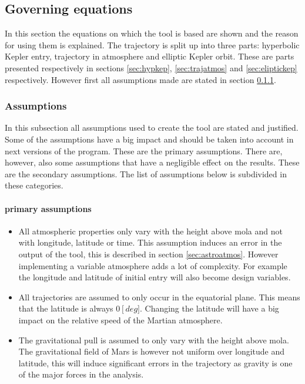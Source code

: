 \subsection{Governing equations}
\label{sec:astrogov}
In this section the equations on which the tool is based are shown and the reason for using them is explained. The trajectory is split up into three parts: hyperbolic Kepler entry, trajectory in atmosphere and elliptic Kepler orbit. These are parts presented respectively in sections \ref{sec:hypkep}, \ref{sec:trajatmos} and \ref{sec:eliptickep} respectively. However first all assumptions made are stated in section \ref{sec:astroassumption}.

\subsubsection{Assumptions}
 \label{sec:astroassumption}
 In this subsection all assumptions used to create the tool are stated and justified. Some of the assumptions have a big impact and should be taken into account in next versions of the program. These are the primary assumptions. There are, however, also some assumptions that have a negligible effect on the results. These are the secondary assumptions. The list of assumptions below is subdivided in these categories.
 
 \paragraph{primary assumptions}
 \begin{itemize}
 \item All atmospheric properties only vary with the height above \gls{mola} and not with longitude, latitude or time. This assumption induces an error in the output of the tool, this is described in section \ref{sec:astroatmos}. However implementing a variable atmosphere adds a lot of complexity. For example the longitude and latitude of initial entry will also become design variables.
 \item All trajectories are assumed to only occur in the equatorial plane. This means that the latitude is always $0 \left[deg]$. Changing the latitude will have a big impact on the relative speed of the Martian atmosphere.
 \item The gravitational pull is assumed to only vary with the height above \gls{mola}. The gravitational field of Mars is however not uniform over longitude and latitude, this will induce significant errors in the trajectory as gravity is one of the major forces in the analysis.
 \end{itemize}

